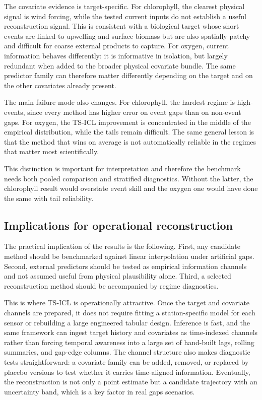 The covariate evidence is target-specific. For chlorophyll, the clearest physical signal is
wind forcing, while the tested current inputs do not establish a useful
reconstruction signal. This is consistent with a biological target whose short events are linked to
upwelling and surface biomass but are also spatially patchy and difficult for coarse external products
to capture. For oxygen, current information behaves differently: it is informative in
isolation, but largely redundant when added to the broader physical covariate bundle. The same
predictor family can therefore matter differently depending on the target and on the other covariates
already present.

The main failure mode also changes. For chlorophyll, the hardest regime is high-\chl{} events, since every method has higher error on event gaps than on non-event gaps. For oxygen, the TS-ICL improvement
is concentrated in the middle of the empirical distribution, while the tails remain difficult. The same general lesson is that the method
that wins on average is not automatically reliable in the regimes that matter most scientifically.

This distinction is important for interpretation and therefore the benchmark needs both
pooled comparison and stratified diagnostics. Without the latter, the chlorophyll result
would overstate event skill and the oxygen one would have done the same with tail reliability.

\subsection{Implications for operational reconstruction}
\label{sec:synthesis_operational}

The practical implication of the results is the following. First, any candidate method should be benchmarked against
linear interpolation under artificial gaps. Second, external predictors should be tested as empirical
information channels and not assumed useful from physical plausibility alone. Third, a selected
reconstruction method should be accompanied by regime diagnostics.

This is where TS-ICL is operationally attractive. Once the target and covariate channels are
prepared, it does not require fitting a station-specific model for each sensor or rebuilding a
large engineered tabular design. Inference is fast, and the same framework can ingest target
history and covariates as time-indexed channels rather than forcing temporal awareness into a
large set of hand-built lags, rolling summaries, and gap-edge columns. The channel structure also
makes diagnostic tests straightforward: a covariate family can be added, removed, or replaced by
placebo versions to test whether it carries time-aligned information. Eventually, the reconstruction is not only a point estimate but a candidate trajectory
with an uncertainty band, which is a key factor in real gaps scenarios.